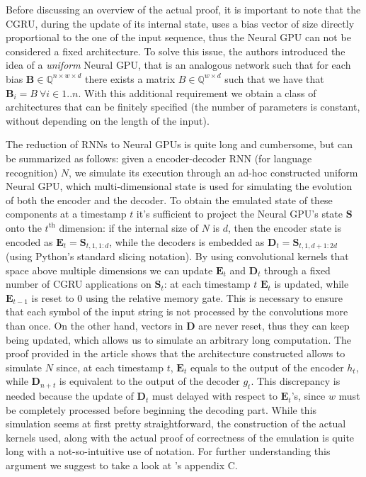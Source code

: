 \documentclass{article}
\begin{document}
Before discussing an overview of the actual proof, it is important to note that the CGRU, during the update of its internal state, uses a bias vector of size directly proportional to the one of the input sequence, thus the Neural GPU can not be considered a fixed architecture. To solve this issue, the authors introduced the idea of a \textit{uniform} Neural GPU, that is an analogous network such that for each bias $\mathbf{B} \in \mathbb{Q}^{n \times w \times d}$ there exists a matrix $B \in \mathbb{Q}^{w \times d}$ such that we have that $\mathbf{B}_i = B\ \forall i \in {1..n}$. With this additional requirement we obtain a class of architectures that can be finitely specified (the number of parameters is constant, without depending on the length of the input).

The reduction of RNNs to Neural GPUs is quite long and cumbersome, but can be summarized as follows: given a encoder-decoder RNN (for language recognition) $N$, we simulate its execution through an ad-hoc constructed uniform Neural GPU, which multi-dimensional state is used for simulating the evolution of both the encoder and the decoder. To obtain the emulated state of these components at a timestamp $t$ it's sufficient to project the Neural GPU's state $\mathbf{S}$ onto the $t^{\textrm{th}}$ dimension: if the internal size of $N$ is $d$, then the encoder state is encoded as $\mathbf{E}_t = \mathbf{S}_{t,1,1:d}$, while the decoders is embedded as $\mathbf{D}_t = \mathbf{S}_{t,1,d+1:2d}$ (using Python's standard slicing notation). By using convolutional kernels that space above multiple dimensions we can update $\mathbf{E}_t$ and $\mathbf{D}_t$ through a fixed number of CGRU applications on $\mathbf{S}_t$: at each timestamp $t$ $\mathbf{E}_t$ is updated, while $\mathbf{E}_{t-1}$ is reset to $0$ using the relative memory gate. This is necessary to ensure that each symbol of the input string is not processed by the convolutions more than once. On the other hand, vectors in $\mathbf{D}$ are never reset, thus they can keep being updated, which allows us to simulate an arbitrary long computation. The proof provided in the article shows that the architecture constructed allows to simulate $N$ since, at each timestamp $t$, $\mathbf{E}_t$ equals to the output of the encoder $h_t$, while $\mathbf{D}_{n+t}$ is equivalent to the output of the decoder $g_t$. This discrepancy is needed because the update of $\mathbf{D}_t$ must delayed with respect to $\mathbf{E}_t$'s, since $w$ must be completely processed before beginning the decoding part. While this simulation seems at first pretty straightforward, the construction of the actual kernels used, along with the actual proof of correctness of the emulation is quite long with a not-so-intuitive use of notation. For further understanding this argument we suggest to take a look at \cite{PER19}'s appendix C.
\end{document}
